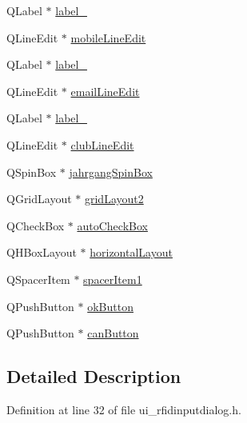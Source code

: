 \begin{CompactItemize}
QLabel $\ast$ \hyperlink{class_ui___r_f_i_d_input_dialog_class_448c79e3b01ebc022e26df42c0720235}{label\_}
\item 
QLineEdit $\ast$ \hyperlink{class_ui___r_f_i_d_input_dialog_class_84a036036ae9f5a4c1814515bfdc1df8}{mobileLineEdit}
\item 
QLabel $\ast$ \hyperlink{class_ui___r_f_i_d_input_dialog_class_01203552d5829c81f884bc59317f4d8e}{label\_}
\item 
QLineEdit $\ast$ \hyperlink{class_ui___r_f_i_d_input_dialog_class_729f97e2df77d68801004df385955298}{emailLineEdit}
\item 
QLabel $\ast$ \hyperlink{class_ui___r_f_i_d_input_dialog_class_05ccb5a16ae3d611ecb4a6d72c5b3acb}{label\_}
\item 
QLineEdit $\ast$ \hyperlink{class_ui___r_f_i_d_input_dialog_class_ab05223309a28747a07d0ed753b2a462}{clubLineEdit}
\item 
QSpinBox $\ast$ \hyperlink{class_ui___r_f_i_d_input_dialog_class_049ac450ed517de9f065df16c1ab6dd6}{jahrgangSpinBox}
\item 
QGridLayout $\ast$ \hyperlink{class_ui___r_f_i_d_input_dialog_class_44a496c71adef62652c814b3b53865a1}{gridLayout2}
\item 
QCheckBox $\ast$ \hyperlink{class_ui___r_f_i_d_input_dialog_class_454ba717043816e016529def2fb17ec2}{autoCheckBox}
\item 
QHBoxLayout $\ast$ \hyperlink{class_ui___r_f_i_d_input_dialog_class_ad85e4c101e18ac7903e308f57ce2e57}{horizontalLayout}
\item 
QSpacerItem $\ast$ \hyperlink{class_ui___r_f_i_d_input_dialog_class_226268b616a75c1918b6375db6c349d0}{spacerItem1}
\item 
QPushButton $\ast$ \hyperlink{class_ui___r_f_i_d_input_dialog_class_466733b11e6270286e6388da03a41c12}{okButton}
\item 
QPushButton $\ast$ \hyperlink{class_ui___r_f_i_d_input_dialog_class_39433ec307d7126f4778f989d79e6607}{canButton}
\end{CompactItemize}


\subsection{Detailed Description}


Definition at line 32 of file ui\_\-rfidinputdialog.h.

